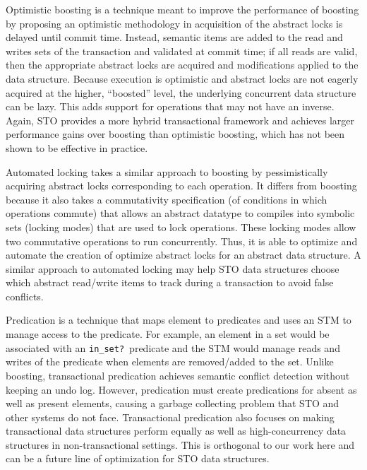 Optimistic boosting\cite{optboost} is a technique meant to improve the performance of boosting by proposing an optimistic methodology in acquisition of the abstract locks is delayed until commit time. Instead, semantic items are added to the read and writes sets of the transaction and validated at commit time; if all reads are valid, then the appropriate abstract locks are acquired and modifications applied to the data structure. Because execution is optimistic and abstract locks are not eagerly acquired at the higher, ``boosted'' level, the underlying concurrent data structure can be lazy. This adds support for operations that may not have an inverse. Again, STO provides a more hybrid transactional framework and achieves larger performance gains over boosting than optimistic boosting, which has not been shown to be effective in practice. 

Automated locking\cite{autolock} takes a similar approach to boosting by pessimistically acquiring abstract locks corresponding to each operation. It differs from boosting because it also takes a commutativity specification (of conditions in which operations commute) that allows an abstract datatype to compiles into symbolic sets (locking modes) that are used to lock operations. These locking modes allow two commutative operations to run concurrently. Thus, it is able to optimize and automate the creation of optimize abstract locks for an abstract data structure. A similar approach to automated locking may help STO data structures choose which abstract read/write items to track during a transaction to avoid false conflicts.

Predication\cite{predication} is a technique that maps element to predicates and uses an STM to manage access to the predicate. For example, an element in a set would be associated with an \texttt{in\_set?}\ predicate and the STM would manage reads and writes of the predicate when elements are removed/added to the set. Unlike boosting, transactional predication achieves semantic conflict detection without keeping an undo log. However, predication must create predications for absent as well as present elements, causing a garbage collecting problem that STO and other systems do not face. Transactional predication also focuses on making transactional data structures perform equally as well as high-concurrency data structures in non-transactional settings. This is orthogonal to our work here and can be a future line of optimization for STO data structures.

